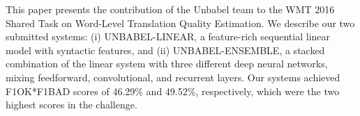 This paper presents the contribution of the Unbabel team to the WMT 2016 Shared Task on Word-Level Translation Quality Estimation. We describe our two submitted systems: (i) UNBABEL-LINEAR, a feature-rich sequential linear model with syntactic features, and (ii) UNBABEL-ENSEMBLE, a stacked combination of the linear system with three different deep neural networks, mixing feedforward, convolutional, and recurrent layers. Our systems achieved F1OK*F1BAD scores of 46.29\% and 49.52\%, respectively, which were the two highest scores in the challenge.

